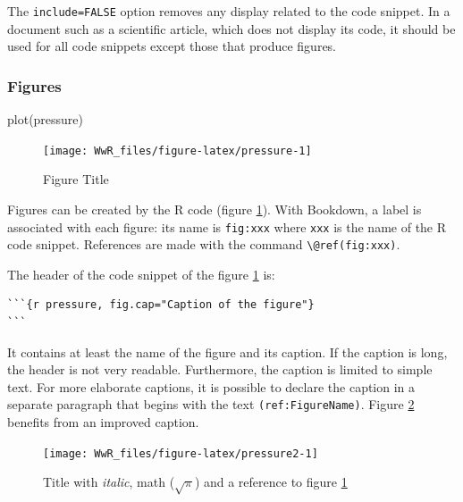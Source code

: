 \documentclass[
  12pt,
  american,
  a4paper,
  extrafontsizes,onecolumn,openright
  ]{memoir}
\newenvironment{Shaded}{\begin{snugshade}}{\end{snugshade}}
\newcommand{\FunctionTok}[1]{\textcolor[rgb]{0.00,0.00,0.00}{#1}}
\newcommand{\NormalTok}[1]{#1}
\begin{document}
The \texttt{include=FALSE} option removes any display related to the code snippet.
In a document such as a scientific article, which does not display its code, it should be used for all code snippets except those that produce figures.

\hypertarget{figures}{%
\subsubsection{Figures}\label{figures}}

\scriptsize

\begin{Shaded}
\begin{Highlighting}[]
\FunctionTok{plot}\NormalTok{(pressure)}
\end{Highlighting}
\end{Shaded}

\begin{figure}

{\centering \texttt{[image: WwR\_files/figure-latex/pressure-1]} 

}

\caption{Figure Title}\label{fig:pressure}
\end{figure}

\normalsize

Figures can be created by the R code (figure \ref{fig:pressure}).
With Bookdown, a label is associated with each figure: its name is \texttt{fig:xxx} where \texttt{xxx} is the name of the R code snippet.
References are made with the command \texttt{\textbackslash{}@ref(fig:xxx)}.

The header of the code snippet of the figure \ref{fig:pressure} is:

\begin{verbatim}
```{r pressure, fig.cap="Caption of the figure"}
```
\end{verbatim}

It contains at least the name of the figure and its caption.
If the caption is long, the header is not very readable.
Furthermore, the caption is limited to simple text.
For more elaborate captions, it is possible to declare the caption in a separate paragraph that begins with the text \texttt{(ref:FigureName)}.
Figure \ref{fig:pressure2} benefits from an improved caption.



\scriptsize

\begin{figure}

{\centering \texttt{[image: WwR\_files/figure-latex/pressure2-1]} 

}

\caption{Title with \emph{italic}, math (\(\sqrt\pi\)) and a reference to figure \ref{fig:pressure}}\label{fig:pressure2}
\end{figure}
\end{document}
